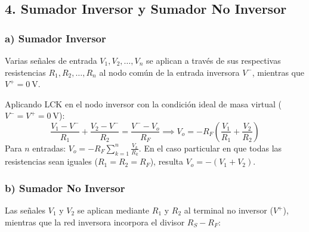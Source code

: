 \subsection{4. Sumador Inversor y Sumador No Inversor}

\subsubsection{a) Sumador Inversor}
Varias señales de entrada $V_1, V_2, \dots, V_n$ se aplican a través de sus respectivas resistencias $R_1, R_2, \dots, R_n$ al nodo común de la entrada inversora $V^-$, mientras que $V^+ = 0\ \si{\volt}$.

\begin{center}
\end{center}

Aplicando LCK en el nodo inversor con la condición ideal de masa virtual ($V^- = V^+ = 0\ \si{\volt}$):
\begin{equation}
    \frac{V_1 - V^-}{R_1} + \frac{V_2 - V^-}{R_2} = \frac{V^- - V_o}{R_F} \implies \boxed{V_o = -R_F \left(\frac{V_1}{R_1} + \frac{V_2}{R_2}\right)}
\end{equation}
Para $n$ entradas: $V_o = -R_F \sum_{k=1}^n \frac{V_k}{R_k}$. En el caso particular en que todas las resistencias sean iguales ($R_1 = R_2 = R_F$), resulta $V_o = -(V_1 + V_2)$.

\subsubsection{b) Sumador No Inversor}
Las señales $V_1$ y $V_2$ se aplican mediante $R_1$ y $R_2$ al terminal no inversor ($V^+$), mientras que la red inversora incorpora el divisor $R_S - R_F$:

